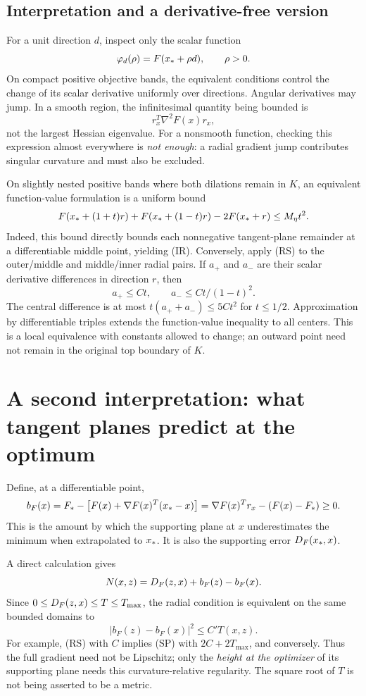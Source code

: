 \documentclass[10pt,oneside,openany]{book}
\theoremstyle{remark}\newtheorem{remark}{Remark}[chapter]
\begin{document}
\subsection{Interpretation and a derivative-free version}
For a unit direction $d$, inspect only the scalar function
\[
 \varphi_d(\rho)=F(x_*+\rho d),\qquad \rho>0.
\]
On compact positive objective bands, the equivalent conditions control the change of its scalar derivative uniformly over directions. Angular derivatives may jump. In a smooth region, the infinitesimal quantity being bounded is
\[
 r_x^T\nabla^2F(x)r_x,
\]
not the largest Hessian eigenvalue. For a nonsmooth function, checking this expression almost everywhere is \emph{not enough}: a radial gradient jump contributes singular curvature and must also be excluded.

On slightly nested positive bands where both dilations remain in $K$, an equivalent function-value formulation is a uniform bound
\begin{equation}
 F(x_*+(1+t)r)+F(x_*+(1-t)r)-2F(x_*+r)\le M_\eta t^2.
 \label{R:eq:central}
\end{equation}
Indeed, this bound directly bounds each nonnegative tangent-plane remainder at a differentiable middle point, yielding (IR). Conversely, apply (RS) to the outer/middle and middle/inner radial pairs. If $a_+$ and $a_-$ are their scalar derivative differences in direction $r$, then
\[
 a_+\le C t,\qquad a_-\le Ct/(1-t)^2.
\]
The central difference is at most $t(a_++a_-)\le5Ct^2$ for $t\le1/2$. Approximation by differentiable triples extends the function-value inequality to all centers. This is a local equivalence with constants allowed to change; an outward point need not remain in the original top boundary of $K$.


\setcounter{section}{2}
\setcounter{theorem}{0}
\setcounter{equation}{4}
\section{A second interpretation: what tangent planes predict at the optimum}
Define, at a differentiable point,
\[
 b_F(x)=F_*-\bigl[F(x)+\nabla F(x)^T(x_*-x)\bigr]
       =\nabla F(x)^Tr_x-(F(x)-F_*)\ge0.
\]
This is the amount by which the supporting plane at $x$ underestimates the minimum when extrapolated to $x_*$. It is also the supporting error $D_F(x_*,x)$.

A direct calculation gives
\begin{equation}
 N(x,z)=D_F(z,x)+b_F(z)-b_F(x).
 \label{R:eq:intercept}
\end{equation}
Since $0\le D_F(z,x)\le T\le T_{\max}$, the radial condition is equivalent on the same bounded domains to
\begin{equation}
 |b_F(z)-b_F(x)|^2\le C' T(x,z).
 \tag{R.SP}\label{R:eq:SP}
\end{equation}
For example, (RS) with $C$ implies (SP) with $2C+2T_{\max}$, and conversely. Thus the full gradient need not be Lipschitz; only the \emph{height at the optimizer} of its supporting plane needs this curvature-relative regularity. The square root of $T$ is not being asserted to be a metric.
\end{document}
